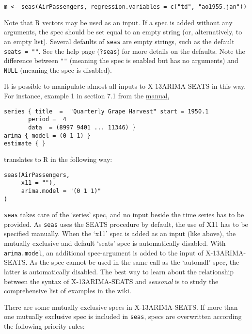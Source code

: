 \begin{verbatim}
m <- seas(AirPassengers, regression.variables = c("td", "ao1955.jan"))
\end{verbatim}

Note that R vectors may be used as an input. If a spec is added without
any arguments, the spec should be set equal to an empty string (or,
alternatively, to an empty list). Several defaults of \texttt{seas} are
empty strings, such as the default \texttt{seats = ""}. See the help
page (\texttt{?seas}) for more details on the defaults. Note the
difference between \texttt{""} (meaning the spec is enabled but has no
arguments) and \texttt{NULL} (meaning the spec is disabled).

It is possible to manipulate almost all inputs to X-13ARIMA-SEATS in
this way. For instance, example 1 in section 7.1 from the
\href{http://www.census.gov/ts/x13as/docX13AS.pdf}{manual},

\begin{verbatim}
series { title  =  "Quarterly Grape Harvest" start = 1950.1
       period =  4
       data  = (8997 9401 ... 11346) }
arima { model = (0 1 1) }
estimate { }
\end{verbatim}

translates to R in the following way:

\begin{verbatim}
seas(AirPassengers,
     x11 = ""),
     arima.model = "(0 1 1)"
)
\end{verbatim}

\texttt{seas} takes care of the `series' spec, and no input beside the
time series has to be provided. As \texttt{seas} uses the SEATS
procedure by default, the use of X11 has to be specified manually. When
the `x11' spec is added as an input (like above), the mutually exclusive
and default `seats' spec is automatically disabled. With
\texttt{arima.model}, an additional spec-argument is added to the input
of X-13ARIMA-SEATS. As the spec cannot be used in the same call as the
`automdl' spec, the latter is automatically disabled. The best way to
learn about the relationship between the syntax of X-13ARIMA-SEATS and
\emph{seasonal} is to study the comprehensive list of examples in the
\href{https://github.com/christophsax/seasonal/wiki/Examples-of-X-13ARIMA-SEATS-in-R}{wiki}.

There are some mutually exclusive specs in X-13ARIMA-SEATS. If more than
one mutually exclusive spec is included in \texttt{seas}, specs are
overwritten according the following priority rules:

